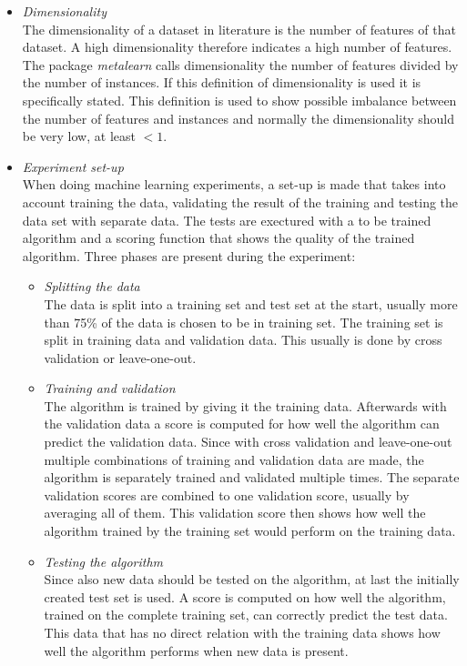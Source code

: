 \documentclass[10pt,a4paper]{report}
\begin{document}
\begin{itemize}
\begin{itemize}
		\end{itemize}
		\item \textit{Dimensionality} \\
		The dimensionality of a dataset in literature is the number of features of that dataset\cite{yu2003feature,lim2003planar,biesiada2007feature}. A high dimensionality therefore indicates a high number of features. The package \textit{metalearn} calls dimensionality the number of features divided by the number of instances. If this definition of dimensionality is used it is specifically stated. This definition is used to show possible imbalance between the number of features and instances and normally the dimensionality should be very low, at least $<1$.
		\item \textit{Experiment set-up} \\
		When doing machine learning experiments, a set-up is made that takes into account training the data, validating the result of the training and testing the data set with separate data. The tests are exectured with a to be trained algorithm and a scoring function that shows the quality of the trained algorithm. Three phases are present during the experiment:
		\begin{itemize}
			\item \textit{Splitting the data} \\
			The data is split into a training set and test set at the start, usually more than 75\% of the data is chosen to be in training set. The training set is split in training data and validation data. This usually is done by cross validation or leave-one-out. 
			\item \textit{Training and validation} \\
			The algorithm is trained by giving it the training data. Afterwards with the validation data a score is computed for how well the algorithm can predict the validation data. Since with cross validation and leave-one-out multiple combinations of training and validation data are made, the algorithm is separately trained and validated multiple times. The separate validation scores are combined to one validation score, usually by averaging all of them. This validation score then shows how well the algorithm trained by the training set would perform on the training data.
			\item \textit{Testing the algorithm} \\
			Since also new data should be tested on the algorithm, at last the initially created test set is used. A score is computed on how well the algorithm, trained on the complete training set, can correctly predict the test data. This data that has no direct relation with the training data shows how well the algorithm performs when new data is present.

\end{itemize}
\end{itemize}
\end{document}
